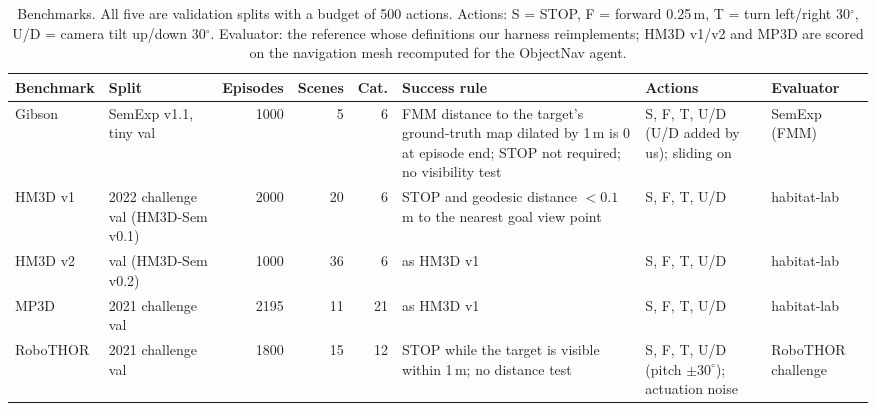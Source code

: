 \documentclass[10pt]{article}
\begin{document}
\begin{table}[t]
  \centering
  \footnotesize
  \setlength{\tabcolsep}{4pt}
  \caption{Benchmarks. All five are validation splits with a budget of 500 actions. Actions: S = STOP,
  F = forward 0.25\,m, T = turn left/right 30$^\circ$, U/D = camera tilt up/down 30$^\circ$. Evaluator: the
  reference whose definitions our harness reimplements; HM3D v1/v2 and MP3D are scored on the navigation mesh
  recomputed for the ObjectNav agent.}
  \label{tab:benchmarks}
  \begin{tabular}{@{}p{1.45cm}p{2.25cm}rrrp{3.85cm}p{2.0cm}p{1.75cm}@{}}
    \toprule
    Benchmark & Split & Episodes & Scenes & Cat. & Success rule & Actions & Evaluator \\
    \midrule
    Gibson & SemExp v1.1, tiny val & 1000 & 5 & 6 & FMM distance to the target's ground-truth map dilated by 1\,m
      is 0 at episode end; STOP not required; no visibility test & S, F, T, U/D (U/D added by us); sliding on & SemExp (FMM) \\
    HM3D v1 & 2022 challenge val (HM3D-Sem v0.1) & 2000 & 20 & 6 & STOP and geodesic distance $<0.1$\,m to the
      nearest goal view point & S, F, T, U/D & habitat-lab \\
    HM3D v2 & val (HM3D-Sem v0.2) & 1000 & 36 & 6 & as HM3D v1 & S, F, T, U/D & habitat-lab \\
    MP3D & 2021 challenge val & 2195 & 11 & 21 & as HM3D v1 & S, F, T, U/D & habitat-lab \\
    RoboTHOR & 2021 challenge val & 1800 & 15 & 12 & STOP while the target is visible within 1\,m; no distance
      test & S, F, T, U/D (pitch $\pm30^\circ$); actuation noise & RoboTHOR challenge \\
    \bottomrule
  \end{tabular}
\end{table}
\end{document}
